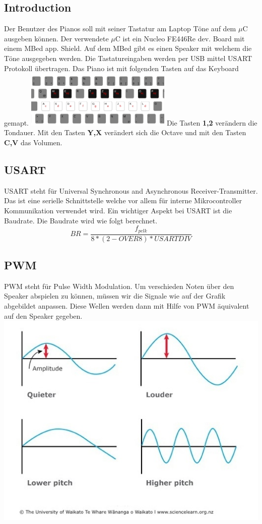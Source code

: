 \documentclass[
   10.5pt,
   invert-title=true,
   titlepage=false,
   titleimage-ratio=13,
   class=article
]{bfhpub}				%
\begin{document}
\begin{multicols}{2}
\section*{Introduction}
Der Benutzer des Pianos soll mit seiner Tastatur am Laptop Töne auf dem $\mu$C ausgeben können. Der verwendete $\mu$C ist ein Nucleo FE446Re dev. Board mit einem MBed app. Shield. Auf dem MBed gibt es einen Speaker mit welchem die Töne ausgegeben werden. Die Tastatureingaben werden per USB mittel USART Protokoll übertragen. Das Piano ist mit folgenden Tasten auf das Keyboard gemapt.\newline
\includegraphics[width=70mm,scale=0.6]{keymap}
Die Tasten \textbf{1,2} verändern die Tondauer. Mit den Tasten \textbf{Y,X} verändert sich die Octave und mit den Tasten \textbf{C,V} das Volumen.
\subsection*{USART}
USART steht für Universal Synchronous and Asynchronous Receiver-Transmitter. Das ist eine serielle Schnittstelle welche vor allem für interne Mikrocontroller Kommunikation verwendet wird. Ein wichtiger Aspekt bei USART ist die Baudrate. Die Baudrate wird wie folgt berechnet.
\setlength{\belowdisplayskip}{0pt} \setlength{\belowdisplayshortskip}{0pt}
\setlength{\abovedisplayskip}{0pt} \setlength{\abovedisplayshortskip}{0pt}
\[BR = \frac{f_{pclk} }{8*(2- OVER8) * USARTDIV}\]
\subsection*{PWM}
PWM steht für Pulse Width Modulation. Um verschieden Noten über den Speaker abspielen zu können, müssen wir die Signale wie auf der Grafik abgebildet anpassen. Diese Wellen werden dann mit Hilfe von PWM äquivalent auf den Speaker gegeben.
\includegraphics[width=40mm\\]{graphSound} 

\end{multicols}
\end{document}
